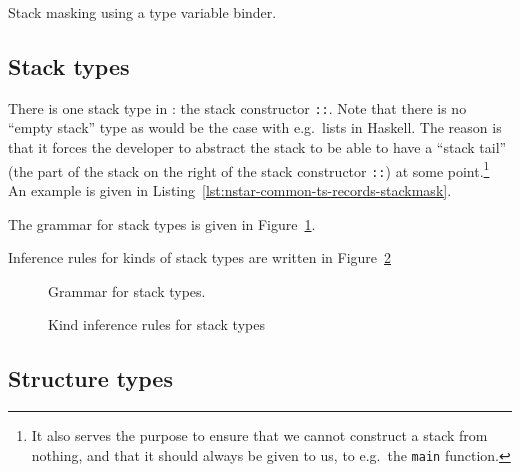 \begin{listing}[htb]
	\centering
	\inputminted{\nstarlexer}{examples/stack-masking.nst}

	\caption{Stack masking using a type variable binder.}
	\label{lst:nstar-common-ts-records-stackmask}
\end{listing}

\subsection{Stack types}\label{subsec:nstar-common-ts-stack}

There is one stack type in \nstar: the stack constructor \texttt{::}.
Note that there is no ``empty stack'' type as would be the case with e.g.\ lists in Haskell.
The reason is that it forces the developer to abstract the stack to be able to have a ``stack tail'' (the part of the stack on the right of the stack constructor \texttt{::}) at some point.\footnote{It also serves the purpose to ensure that we cannot construct a stack from nothing, and that it should always be given to us, to e.g.\ the \texttt{main} function.}
An example is given in Listing~\ref{lst:nstar-common-ts-records-stackmask}.

The grammar for stack types is given in Figure~\ref{fig:nstar-common-ts-stack-types-syntax}.

Inference rules for kinds of stack types are written in Figure~\ref{fig:nstar-common-ts-stack-types-kindrules}

\begin{figure}[htb]
	\centering
	\caption{Grammar for stack types.}
	\label{fig:nstar-common-ts-stack-types-syntax}
\end{figure}

\begin{figure}[H]
	\centering


	\caption{Kind inference rules for stack types}
	\label{fig:nstar-common-ts-stack-types-kindrules}
\end{figure}

\subsection{Structure types}\label{subsec:nstar-common-ts-structs}

